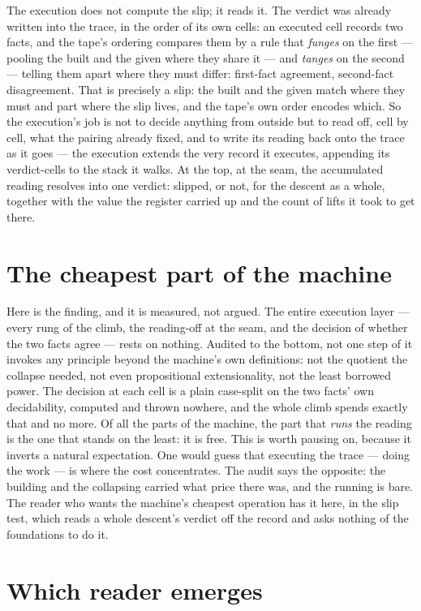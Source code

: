 The execution does not compute the slip; it reads it. The verdict was already written into the trace, in
the order of its own cells: an executed cell records two facts, and the tape's ordering compares them by a
rule that \emph{funges} on the first --- pooling the built and the given where they share it --- and
\emph{tanges} on the second --- telling them apart where they must differ: first-fact agreement, second-fact
disagreement. That is precisely a slip: the built and the given match where they must and part where the
slip lives, and the tape's own order encodes which. So the execution's job is not to decide anything from
outside but to read off, cell by cell, what the pairing already fixed, and to write its reading back onto
the trace as it goes --- the execution extends the very record it executes, appending its verdict-cells to
the stack it walks. At the top, at the seam, the accumulated reading resolves into one verdict: slipped, or
not, for the descent as a whole, together with the value the register carried up and the count of lifts it
took to get there.

\section{The cheapest part of the machine}
\label{se:cheapest-part}

Here is the finding, and it is measured, not argued. The entire execution layer --- every rung of the climb,
the reading-off at the seam, and the decision of whether the two facts agree --- rests on nothing. Audited
to the bottom, not one step of it invokes any principle beyond the machine's own definitions: not the
quotient the collapse needed, not even propositional extensionality, not the least borrowed power. The
decision at each cell is a plain case-split on the two facts' own decidability, computed and thrown nowhere,
and the whole climb spends exactly that and no more. Of all the parts of the machine, the part that
\emph{runs} the reading is the one that stands on the least: it is free. This is worth pausing on, because
it inverts a natural expectation. One would guess that executing the trace --- doing the work --- is where
the cost concentrates. The audit says the opposite: the building and the collapsing carried what price
there was, and the running is bare. The reader who wants the machine's cheapest operation has it here, in
the slip test, which reads a whole descent's verdict off the record and asks nothing of the foundations to
do it.

\section{Which reader emerges}
\label{se:which-reader-emerges}

